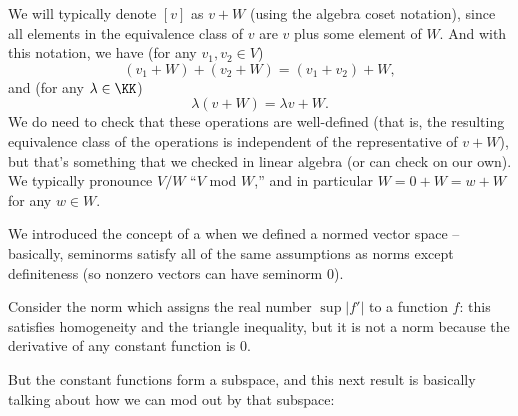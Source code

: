 We will typically denote $[v]$ as $v + W$ (using the algebra coset notation), since all elements in the equivalence class of $v$ are $v$ plus some element of $W$. And with this notation, we have (for any $v_1, v_2 \in V$)
\[
    (v_1 + W) + (v_2 + W) = (v_1 + v_2) + W,
\]
and (for any $\lambda \in \KK$)
\[
    \lambda(v + W) = \lambda v + W.
\]
We do need to check that these operations are well-defined (that is, the resulting equivalence class of the operations is independent of the representative of $v + W$), but that's something that we checked in linear algebra (or can check on our own). We typically pronounce $V/W$ ``$V$ mod $W$,'' and in particular $W = 0 + W = w + W$ for any $w \in W$.

We introduced the concept of a  when we defined a normed vector space -- basically, seminorms satisfy all of the same assumptions as norms except definiteness (so nonzero vectors can have seminorm $0$). 

\begin{example}
Consider the norm which assigns the real number $\sup |f'|$ to a function $f$: this satisfies homogeneity and the triangle inequality, but it is not a norm because the derivative of any constant function is $0$. 
\end{example}

But the constant functions form a subspace, and this next result is basically talking about how we can mod out by that subspace:

